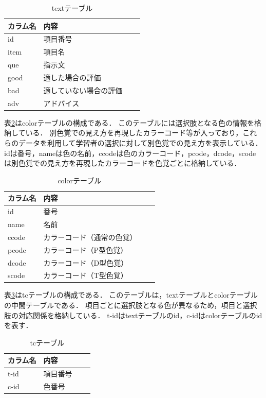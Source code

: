 \begin{table}[h]
    \caption{textテーブル}
   \label{tab:text}
    \centering
    \begin{tabular}{|l||l|l|l|}
        \hline
        カラム名 & 内容  \\ \hline
        \hline
        id & 項目番号 \\ \hline
        item & 項目名 \\ \hline
        que & 指示文 \\ \hline
        good & 適した場合の評価 \\ \hline
        bad & 適していない場合の評価 \\ \hline
        adv & アドバイス \\ \hline         
    \end{tabular}
\end{table}

\clearpage
表\ref{tab:color}はcolorテーブルの構成である．
このテーブルには選択肢となる色の情報を格納している．
別色覚での見え方を再現したカラーコード等が入っており，これらのデータを利用して学習者の選択に対して別色覚での見え方を表示している．
idは番号，nameは色の名前，ccodeは色のカラーコード，pcode，dcode，scodeは別色覚での見え方を再現したカラーコードを色覚ごとに格納している．

\begin{table}[h]
    \caption{colorテーブル}
   \label{tab:color}
    \centering
    \begin{tabular}{|l||l|l|l|}
        \hline
        カラム名 & 内容  \\ \hline
        \hline
        id & 番号 \\ \hline
        name & 名前 \\ \hline
        ccode & カラーコード（通常の色覚） \\ \hline
        pcode & カラーコード（P型色覚） \\ \hline
        dcode & カラーコード（D型色覚） \\ \hline
        scode & カラーコード（T型色覚） \\ \hline         
    \end{tabular}
\end{table}

表\ref{tab:tc}はtcテーブルの構成である．
このテーブルは，textテーブルとcolorテーブルの中間テーブルである．
項目ごとに選択肢となる色が異なるため，項目と選択肢の対応関係を格納している．
t-idはtextテーブルのid，c-idはcolorテーブルのidを表す．

\begin{table}[h]
    \caption{tcテーブル}
   \label{tab:tc}
    \centering
    \begin{tabular}{|l||l|l|l|}
        \hline
        カラム名 & 内容  \\ \hline
        \hline
        t-id & 項目番号 \\ \hline
        c-id & 色番号 \\ \hline   
    \end{tabular}
\end{table}

